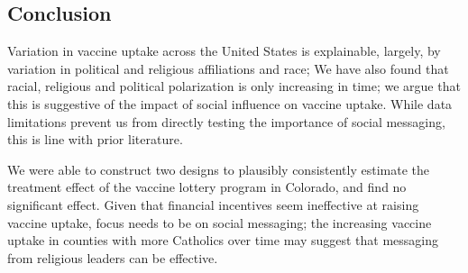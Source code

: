 \documentclass[12pt]{article}
\begin{document}
\begin{spacing}{1.5}
		\section{Conclusion}
		Variation in vaccine uptake across the United States is explainable, largely, by variation in political and religious affiliations and race; We have also found that racial, religious and political polarization is only increasing in time; we argue that this is suggestive of the impact of social influence on vaccine uptake. While data limitations prevent us from directly testing the importance of social messaging, this is line with prior literature.
		
		We were able to construct two designs to plausibly consistently estimate the treatment effect of the vaccine lottery program in Colorado, and find no significant effect. Given that financial incentives seem ineffective at raising vaccine uptake, focus needs to be on social messaging; the increasing vaccine uptake in counties with more Catholics over time may suggest that messaging from religious leaders can be effective.
		
	\end{spacing}
\end{document}
